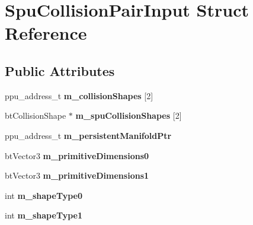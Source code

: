 \hypertarget{struct_spu_collision_pair_input}{\section{Spu\+Collision\+Pair\+Input Struct Reference}
\label{struct_spu_collision_pair_input}
}
\subsection*{Public Attributes}
\begin{DoxyCompactItemize}
\item 
\hypertarget{struct_spu_collision_pair_input_a7b2a39562700ed3807c6b1ea32cae3b5}{ppu\+\_\+address\+\_\+t {\bfseries m\+\_\+collision\+Shapes} \mbox{[}2\mbox{]}}\label{struct_spu_collision_pair_input_a7b2a39562700ed3807c6b1ea32cae3b5}

\item 
\hypertarget{struct_spu_collision_pair_input_a67a3bafc8c5398d9cf84479d1b137767}{bt\+Collision\+Shape $\ast$ {\bfseries m\+\_\+spu\+Collision\+Shapes} \mbox{[}2\mbox{]}}\label{struct_spu_collision_pair_input_a67a3bafc8c5398d9cf84479d1b137767}

\item 
\hypertarget{struct_spu_collision_pair_input_a034646c4c1a2584541f58168ddc4a29f}{ppu\+\_\+address\+\_\+t {\bfseries m\+\_\+persistent\+Manifold\+Ptr}}\label{struct_spu_collision_pair_input_a034646c4c1a2584541f58168ddc4a29f}

\item 
\hypertarget{struct_spu_collision_pair_input_a0e22c42e55754830e618822f30cc4864}{bt\+Vector3 {\bfseries m\+\_\+primitive\+Dimensions0}}\label{struct_spu_collision_pair_input_a0e22c42e55754830e618822f30cc4864}

\item 
\hypertarget{struct_spu_collision_pair_input_a55768b4d39fdf2c284dc81916a0ad91b}{bt\+Vector3 {\bfseries m\+\_\+primitive\+Dimensions1}}\label{struct_spu_collision_pair_input_a55768b4d39fdf2c284dc81916a0ad91b}

\item 
\hypertarget{struct_spu_collision_pair_input_a27ee106768e33bbeb8287412958f4502}{int {\bfseries m\+\_\+shape\+Type0}}\label{struct_spu_collision_pair_input_a27ee106768e33bbeb8287412958f4502}

\item 
\hypertarget{struct_spu_collision_pair_input_aaedd38dc580e477dde7cff180ea9a9ff}{int {\bfseries m\+\_\+shape\+Type1}}\label{struct_spu_collision_pair_input_aaedd38dc580e477dde7cff180ea9a9ff}


\end{DoxyCompactItemize}
